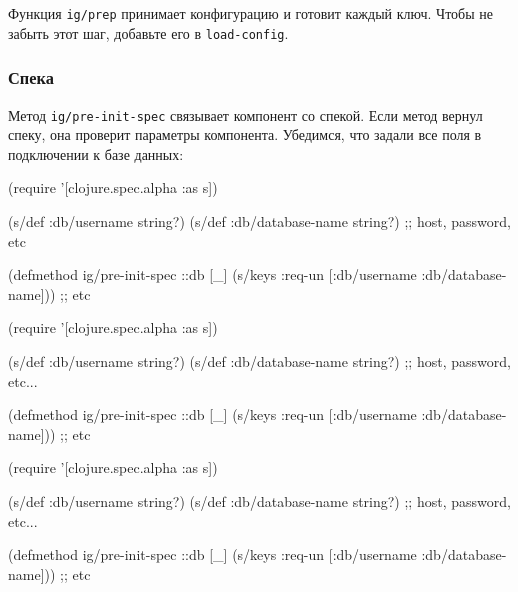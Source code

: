 \fi

Функция \verb|ig/prep| принимает конфигурацию и готовит каждый ключ. Чтобы не
забыть этот шаг, добавьте его в \verb|load-config|.

\subsubsection{Спека}


Метод \verb|ig/pre-init-spec| связывает компонент со спекой. Если метод вернул
спеку, она проверит параметры компонента. Убедимся, что задали все поля в
подключении к базе данных:

\ifnarrow

\begin{english}
  \begin{clojure}
(require '[clojure.spec.alpha :as s])

(s/def :db/username string?)
(s/def :db/database-name string?)
;; host, password, etc

(defmethod ig/pre-init-spec ::db [_]
  (s/keys :req-un [:db/username
                   :db/database-name]))
                   ;; etc
  \end{clojure}
\end{english}

\else

\ifafive

\begin{english}
  \begin{clojure}
(require '[clojure.spec.alpha :as s])

(s/def :db/username string?)
(s/def :db/database-name string?)
;; host, password, etc...
  \end{clojure}
\end{english}

\pagebreak[4]

\begin{english}
  \begin{clojure}
(defmethod ig/pre-init-spec ::db [_]
  (s/keys :req-un [:db/username
                   :db/database-name])) ;; etc
  \end{clojure}
\end{english}

\else

\begin{english}
  \begin{clojure}
(require '[clojure.spec.alpha :as s])

(s/def :db/username string?)
(s/def :db/database-name string?)
;; host, password, etc...

(defmethod ig/pre-init-spec ::db [_]
  (s/keys :req-un [:db/username
                   :db/database-name])) ;; etc
  \end{clojure}
\end{english}

